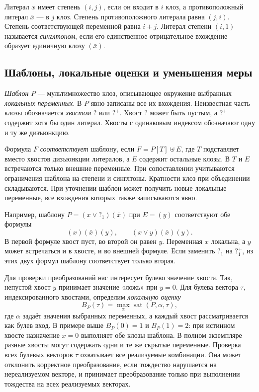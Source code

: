 \documentclass[10pt,twoside]{article}
\newcommand{\anytail}{\mathord{?}}
\newcommand{\plustail}{\mathord{?}^{+}}
\newcommand{\tail}[1]{\mathord{?}_{#1}}
\newcommand{\ntail}[1]{\mathord{?}^{+}_{#1}}
\theoremstyle{definition}
\theoremstyle{remark}
\begin{document}
Литерал $x$ имеет степень $(i,j)$, если он входит в $i$ клоз, а
противоположный литерал $\bar x$ --- в $j$ клоз. Степень противоположного
литерала равна $(j,i)$. Степень соответствующей переменной равна $i+j$.
Литерал степени $(i,1)$ называется \emph{синглтоном}, если его
единственное отрицательное вхождение образует единичную клозу $(\bar x)$.

\subsection{Шаблоны, локальные оценки и уменьшения меры}
\label{sec:local-notation}

\emph{Шаблон} $P$ --- мультимножество клоз, описывающее окружение
выбранных \emph{локальных переменных}. В $P$ явно записаны все их
вхождения. Неизвестная часть клозы обозначается
\emph{хвостом} $\anytail$ или $\plustail$. Хвост $\anytail$ может быть
пустым, а $\plustail$ содержит хотя бы один литерал. Хвосты с одинаковым
индексом обозначают одну и ту же дизъюнкцию.

Формула $F$ \emph{соответствует} шаблону, если $F=P[T]\uplus E$, где
$T$ подставляет вместо хвостов дизъюнкции литералов, а $E$ содержит
остальные клозы. В $T$ и $E$ встречаются только внешние переменные.
При сопоставлении учитываются ограничения шаблона на степени и
синглтоны. Кратности клоз при объединении складываются. При уточнении
шаблон может получить новые локальные переменные, все вхождения
которых также записываются явно.

Например, шаблону $P=(x\vee\tail{1})(\bar x)$ при $E=(y)$ соответствуют
обе формулы
\[
  (x)(\bar x)(y),\qquad (x\vee y)(\bar x)(y).
\]
В первой формуле хвост пуст, во второй он равен $y$. Переменная $x$
локальна, а $y$ может встречаться и в хвосте, и во внешней формуле.
Если заменить $\tail{1}$ на $\ntail{1}$, из этих двух формул шаблону
соответствует только вторая.

Для проверки преобразований нас интересует булево значение хвоста.
Так, непустой хвост $y$ принимает значение «ложь» при $y=0$.
Для булева вектора $\tau$, индексированного хвостами, определим
\emph{локальную оценку}
\begin{equation}
 B_P(\tau)=\max_{\alpha}\operatorname{sat}(P,\alpha,\tau),
 \label{eq:local-score}
\end{equation}
где $\alpha$ задаёт значения выбранных переменных, а каждый хвост
рассматривается как булев вход. В примере выше $B_P(0)=1$ и $B_P(1)=2$:
при истинном хвосте назначение $x=0$ выполняет обе клозы шаблона.
В полном экземпляре разные хвосты
могут содержать одни и те же скрытые переменные. Проверка всех булевых
векторов $\tau$ охватывает все реализуемые комбинации. Она может отклонить
корректное преобразование, если тождество нарушается на нереализуемом
векторе, и принимает преобразование только при выполнении тождества на
всех реализуемых векторах.
\end{document}
